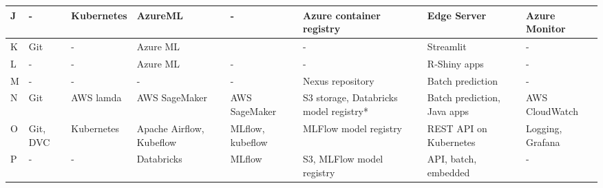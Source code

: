 \begin{table*}[ht]
{\begin{tabular}{lp{}p{}p{2cm}p{2cm}p{}p{}p{2cm}}
         J & - & Kubernetes & AzureML & - & Azure container registry & Edge Server& Azure Monitor
          \\  \hline
          
         K & Git & -& Azure ML & & - & Streamlit & -
          \\  \hline
          
         L & -& -& Azure ML & - & - & R-Shiny apps & -
          \\  \hline
          
         M & - & -& -&- & 
         Nexus repository & Batch prediction & -
          \\  \hline
          
         N & Git & AWS lamda & AWS SageMaker & AWS SageMaker & S3 storage, Databricks model registry* & Batch prediction, Java apps & AWS CloudWatch
          \\  \hline
          
         O & Git, DVC & Kubernetes & Apache Airflow, Kubeflow & MLflow, kubeflow & MLFlow model registry & REST API on Kubernetes & Logging, Grafana
          \\  \hline
          
         P & - & - & Databricks & MLflow & S3, MLFlow model registry & API, batch, embedded & -
          \\  
         
         \bottomrule

    \end{tabular}}
    \label{tab:databases}
\end{table*}
